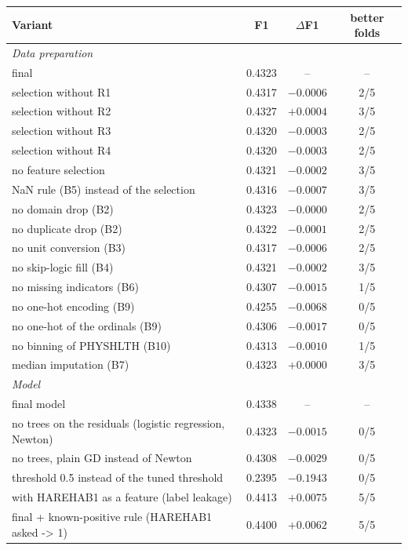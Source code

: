 \begin{tabular}{lccc}
\hline
Variant & F1 & $\Delta$F1 & better folds \\
\hline
\multicolumn{4}{l}{\textit{Data preparation}} \\
final & 0.4323 & -- & -- \\
selection without R1 & 0.4317 & $-0.0006$ & 2/5 \\
selection without R2 & 0.4327 & $+0.0004$ & 3/5 \\
selection without R3 & 0.4320 & $-0.0003$ & 2/5 \\
selection without R4 & 0.4320 & $-0.0003$ & 2/5 \\
no feature selection & 0.4321 & $-0.0002$ & 3/5 \\
NaN rule (B5) instead of the selection & 0.4316 & $-0.0007$ & 3/5 \\
no domain drop (B2) & 0.4323 & $-0.0000$ & 2/5 \\
no duplicate drop (B2) & 0.4322 & $-0.0001$ & 2/5 \\
no unit conversion (B3) & 0.4317 & $-0.0006$ & 2/5 \\
no skip-logic fill (B4) & 0.4321 & $-0.0002$ & 3/5 \\
no missing indicators (B6) & 0.4307 & $-0.0015$ & 1/5 \\
no one-hot encoding (B9) & 0.4255 & $-0.0068$ & 0/5 \\
no one-hot of the ordinals (B9) & 0.4306 & $-0.0017$ & 0/5 \\
no binning of PHYSHLTH (B10) & 0.4313 & $-0.0010$ & 1/5 \\
median imputation (B7) & 0.4323 & $+0.0000$ & 3/5 \\
\hline
\multicolumn{4}{l}{\textit{Model}} \\
final model & 0.4338 & -- & -- \\
no trees on the residuals (logistic regression, Newton) & 0.4323 & $-0.0015$ & 0/5 \\
no trees, plain GD instead of Newton & 0.4308 & $-0.0029$ & 0/5 \\
threshold 0.5 instead of the tuned threshold & 0.2395 & $-0.1943$ & 0/5 \\
with HAREHAB1 as a feature (label leakage) & 0.4413 & $+0.0075$ & 5/5 \\
final + known-positive rule (HAREHAB1 asked -> 1) & 0.4400 & $+0.0062$ & 5/5 \\
\hline
\end{tabular}
